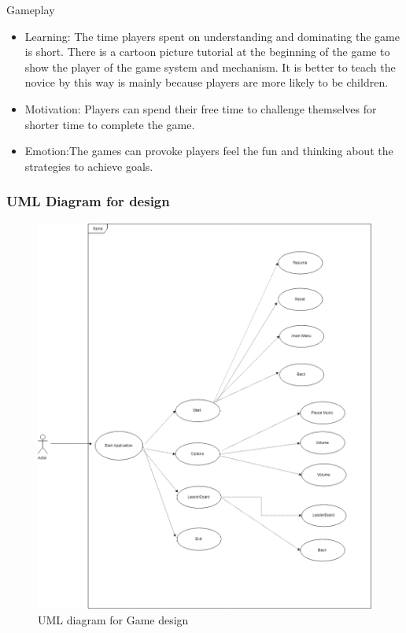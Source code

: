 \documentclass[12pt]{article}
\begin{document}
Gameplay

\begin{itemize}
\item Learning: The time players spent on understanding and dominating the game is short. There is a cartoon picture tutorial at the beginning of the game to show the player of the game system and mechanism. It is better to teach the novice by this way is mainly because players are more likely to be children. 
\item Motivation: Players can spend their free time to challenge themselves for shorter time to complete the game.
\item Emotion:The games can provoke players feel the fun and thinking about the strategies to achieve goals. 

\end{itemize}


\subsubsection{UML Diagram for design}

\begin{figure}[H]
    \centering
    \includegraphics[scale=0.4]{UML.png}
    \caption{UML diagram for Game design}
    \label{fig:UML}
\end{figure}
\end{document}
